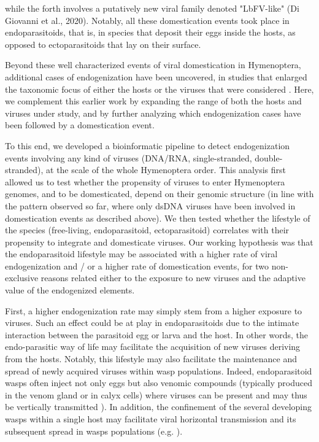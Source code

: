 \citep{bezier_polydnaviruses_2009,pichon_recurrent_2015,burke_common_2019} while the forth involves a putatively new viral family denoted "LbFV-like" (Di Giovanni et al., 2020). Notably, all these domestication events took place in endoparasitoids, that is, in species that deposit their eggs inside the hosts, as opposed to ectoparasitoids that lay on their surface.

Beyond these well characterized events of viral domestication in Hymenoptera, additional cases of endogenization have been uncovered, in studies that enlarged the taxonomic focus of either the hosts \citep{ter_horst_endogenous_2019, cheng_nudivirus_2020,kondo_novel_2019} or the viruses that were considered  \citep{flynn_assessing_2019,ter_horst_endogenous_2019,irwin_systematic_2022,li_hgt_2022}. Here, we complement this earlier work by expanding the range of both the hosts and viruses under study, and by further analyzing which endogenization cases have been followed by a domestication event.

To this end, we developed a bioinformatic pipeline to detect endogenization events involving any kind of viruses (DNA/RNA, single-stranded, double-stranded), at the scale of the whole Hymenoptera order. This analysis first allowed us to test whether the propensity of viruses to enter Hymenoptera genomes, and to be domesticated, depend on their genomic structure (in line with the pattern observed so far, where only dsDNA viruses have been involved in domestication events as described above). 
We then tested whether the lifestyle of the species (free-living, endoparasitoid, ectoparasitoid) correlates with their propensity to integrate and domesticate viruses. Our working hypothesis was that the endoparasitoid lifestyle may be associated with a higher rate of viral endogenization and / or a higher rate of domestication events, for two non-exclusive reasons related either to the exposure  to new viruses and the adaptive value of the endogenized elements.

First, a higher endogenization rate may simply stem from a higher exposure to viruses. Such an effect could be at play in endoparasitoids due to the intimate interaction between the parasitoid egg or larva and the host.  In other words, the endo-parasitic way of life may facilitate the acquisition of new viruses deriving from the hosts. Notably, this lifestyle may also facilitate the maintenance and spread of newly acquired viruses within wasp populations. Indeed, endoparasitoid wasps often inject not only eggs but also venomic compounds (typically produced in the venom gland or in calyx cells) where viruses can be present and may thus be vertically transmitted \citep{martinez_additional_2016}).  In addition, the confinement of the several  developing wasps within a single host may facilitate viral horizontal transmission  and its subsequent spread in wasps populations (e.g. \citep{varaldi_infectious_2003}).

